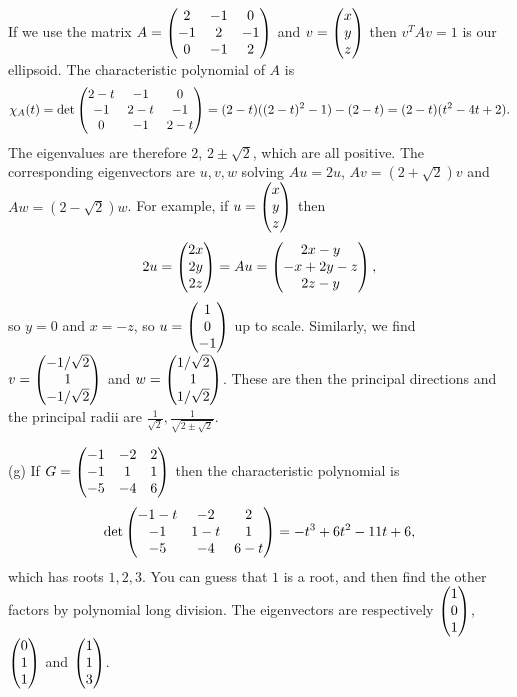 \documentclass{article}
\begin{document}
\begin{Solution}\label{sol:exr:ellipsoid}
If we use the matrix \(A=\begin{pmatrix} 2 & -1 & 0 \\ -1 & 2 & -1 \\ 0 & -1 &
2\end{pmatrix}\) and \(v=\begin{pmatrix} x \\ y \\ z\end{pmatrix}\) then \(v^TAv=1\) is our
ellipsoid. The characteristic polynomial of \(A\) is
\[\chi_A(t)=\det\begin{pmatrix} 2-t & -1 & 0 \\ -1 & 2-t & -1 \\ 0 & -1 &
2-t\end{pmatrix}=(2-t)((2-t)^2-1)-(2-t)=(2-t)(t^2-4t+2).\] The eigenvalues are
therefore \(2\), \(2\pm\sqrt{2}\), which are all positive. The
corresponding eigenvectors are \(u,v,w\) solving \(Au=2u\),
\(Av=(2+\sqrt{2})v\) and \(Aw=(2-\sqrt{2})w\). For example, if
\(u=\begin{pmatrix} x \\ y \\ z\end{pmatrix}\) then \[2u=\begin{pmatrix} 2x \\ 2y \\ 2z\end{pmatrix}=Au=\begin{pmatrix}
2x-y\\ -x+2y-z\\ 2z-y\end{pmatrix},\] so \(y=0\) and \(x=-z\), so \(u=\begin{pmatrix} 1
\\ 0 \\ -1\end{pmatrix}\) up to scale. Similarly, we find \(v=\begin{pmatrix} -1/\sqrt{2}
\\ 1 \\ -1/\sqrt{2}\end{pmatrix}\) and \(w=\begin{pmatrix} 1/\sqrt{2}\\ 1
\\ 1/\sqrt{2}\end{pmatrix}\). These are then the principal directions and the
principal radii are
\(\frac{1}{\sqrt{2}},\frac{1}{\sqrt{2\pm\sqrt{2}}}\).


(g) If \(G=\begin{pmatrix} -1 & -2 & 2 \\ -1 & 1 & 1 \\ -5 & -4 & 6\end{pmatrix}\) then
the characteristic polynomial is \[\det\begin{pmatrix} -1-t & -2 & 2 \\ -1 & 1-t
& 1 \\ -5 & -4 & 6-t\end{pmatrix}=-t^3+6t^2-11t+6,\] which has roots
\(1,2,3\). You can guess that \(1\) is a root, and then find the
other factors by polynomial long division. The eigenvectors are
respectively \(\begin{pmatrix} 1 \\ 0 \\ 1 \end{pmatrix}\), \(\begin{pmatrix} 0 \\ 1 \\ 1\end{pmatrix}\) and
\(\begin{pmatrix} 1 \\ 1 \\ 3\end{pmatrix}\).



\end{Solution}
\end{document}
